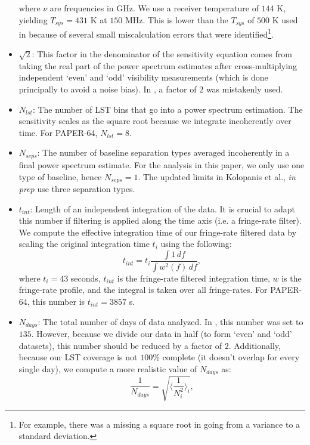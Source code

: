 \documentclass[preprint2,numberedappendix,tighten]{aastex6}  %
\begin{document}
\begin{itemize}
where $\nu$ are frequencies in GHz. We use a receiver temperature of $144$ K, yielding $T_{sys} = 431$ K at $150$ MHz. 
This is lower than the $T_{sys}$ of $500$ K used in  because of several small miscalculation errors that were 
identified\footnote{For example, there was a missing a square root in going from a variance to a standard deviation.}.
\item $\sqrt{2}$: This factor in the denominator of the sensitivity equation comes from taking the real part of the power spectrum 
estimates after cross-multiplying independent `even' and `odd' visibility measurements (which is done principally to avoid a noise bias). In , a factor of $2$ was mistakenly used.
\item $N_{lst}$: The number of LST bins that go into a power spectrum estimation. The sensitivity scales as the square root 
because we integrate incoherently over time. For PAPER-64, $N_{lst} = 8$.
\item $N_{seps}$: The number of baseline separation types averaged incoherently in a final power spectrum estimate. For the 
analysis in this paper, we only use one type of baseline, hence $N_{seps}=1$. The updated limits in Kolopanis et al., \textit{in prep}
use three separation types.
\item $t_{int}$: Length of an independent integration of the data. It is crucial to adapt this number if filtering is applied along the time axis (i.e. a 
fringe-rate filter). We compute the effective integration time of our fringe-rate filtered data by scaling the original integration time $t_{i}$
using the following:
\begin{equation}
t_{int} = t_{i} \frac{\int1 \, df}{\int w^{2}(f) \,df},
\end{equation}
where $t_{i}=43$ seconds, $t_{int}$ is the fringe-rate filtered integration time, $w$ is the fringe-rate profile, and the integral is 
taken over all fringe-rates. For PAPER-64, this number is $t_{int} = 3857$ s. 
\item $N_{days}$: The total number of days of data analyzed. In , this number was set to $135$. However, because we 
divide our data in half (to form `even' and `odd' datasets), this number should be reduced by a factor of $2$. Additionally, 
because our LST coverage is not $100\%$ complete (it doesn't overlap for every single day), we compute a more realistic value of 
$N_{days}$ as:
\begin{equation}
 \frac{1}{N_{days}} = \sqrt{\Big\langle\frac{1}{N_{i}^{2}} \Big\rangle_{i}},

\end{equation}
\end{itemize}
\end{document}
